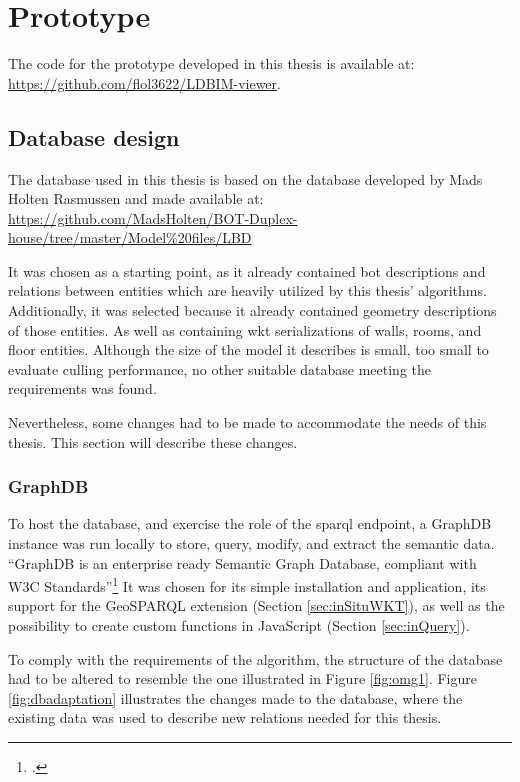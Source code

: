 \chapter{Prototype} \label{ch:prototype}
The code for the prototype developed in this thesis is available at:\\
\url{https://github.com/flol3622/LDBIM-viewer}.

\section{Database design}
The database used in this thesis is based on the database developed by Mads Holten Rasmussen and made available at:\\
\url{https://github.com/MadsHolten/BOT-Duplex-house/tree/master/Model%20files/LBD}

It was chosen as a starting point, as it already contained \ac{bot} descriptions and relations between entities which are heavily utilized by this thesis' algorithms. Additionally, it was selected because it already contained geometry descriptions of those entities. As well as containing \ac{wkt} serializations of walls, rooms, and floor entities. Although the size of the model it describes is small, too small to evaluate culling performance, no other suitable database meeting the requirements was found.

Nevertheless, some changes had to be made to accommodate the needs of this thesis. This section will describe these changes.

\subsection{GraphDB}
To host the database, and exercise the role of the \ac{sparql} endpoint, a GraphDB instance was run locally to store, query, modify, and extract the semantic data. \enquote{GraphDB is an enterprise ready Semantic Graph Database, compliant with W3C Standards}\footcite{graphdb} It was chosen for its simple installation and application, its support for the GeoSPARQL extension (Section \ref{sec:inSituWKT}), as well as the possibility to create custom functions in JavaScript (Section \ref{sec:inQuery}).

To comply with the requirements of the algorithm, the structure of the database had to be altered to resemble the one illustrated in Figure \ref{fig:omg1}. Figure \ref{fig:dbadaptation} illustrates the changes made to the database, where the existing data was used to describe new relations needed for this thesis.

